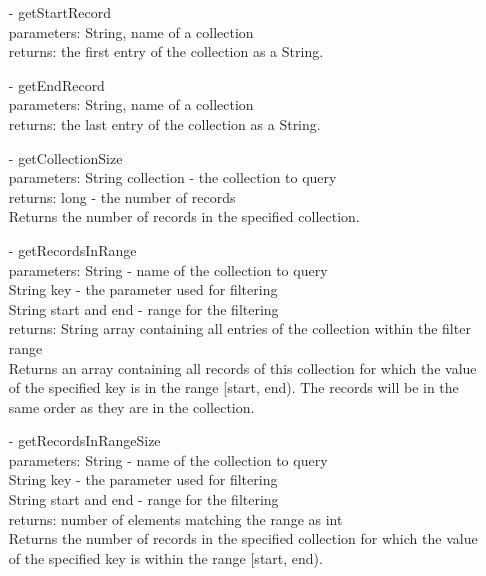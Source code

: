 \documentclass[oneside, english, final]{design}
\begin{document}
\begin{itemize}
\begin{itemize}
		      \item[-]getStartRecord
		            \\parameters: String, name of a collection
		            \\returns: the first entry of the collection as a String.

		      \item[-]getEndRecord
		            \\parameters: String, name of a collection
		            \\returns: the last entry of the collection as a String.

		      \item[-]getCollectionSize
		            \\parameters: String collection - the collection to query
		            \\returns: long - the number of records
		            \\Returns the number of records in the specified collection.

		      \item[-]getRecordsInRange
		            \\parameters: String - name of the collection to query
		            \\String key - the parameter used for filtering
		            \\String start and end - range for the filtering
		            \\returns: String array containing all entries of the collection within the filter range
		            \\ Returns an array containing all records of this
		            collection for which the value of the
		            specified key is in the range [start, end).
		            The records will be in the same order as
		            they are in the collection.

		      \item[-]getRecordsInRangeSize
		            \\parameters: String - name of the collection to query
		            \\String key - the parameter used for filtering
		            \\String start and end - range for the filtering
		            \\returns: number of elements matching the range as int
		            \\Returns the number of records in the specified
		            collection for which the value of the specified
		            key is within the range [start, end).
	      \end{itemize}



\end{itemize}
\end{document}
